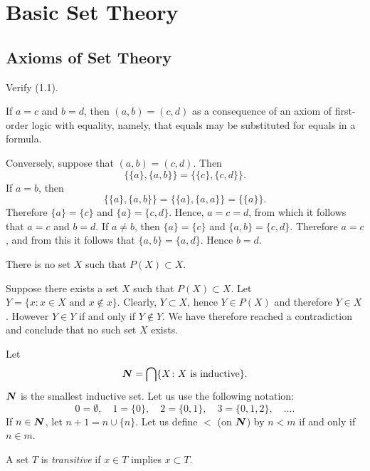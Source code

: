 \part{Basic Set Theory}

\chapter{Axioms of Set Theory}

 Verify (1.1).
\begin{solution}
  If $a = c$ and $b = d$, then $(a, b) = (c, d)$ as a consequence of an axiom of
  first-order logic with equality, namely, that equals may be substituted for
  equals in a formula.

  Conversely, suppose that $(a, b) = (c, d)$. Then
  \[
    \{ \{ a \}, \{ a, b \} \}  = \{ \{ c \}, \{ c, d \} \}.
  \]
  If $a = b$, then
  \[
    \{ \{ a \}, \{ a, b \} \} = \{ \{ a \}, \{ a, a \} \} = \{ \{ a \} \}.
  \]
  Therefore $\{ a \} = \{ c \}$ and  $\{ a \} = \{ c, d \}$. Hence, $a = c = d$,
  from which it follows that $a = c$ and $b = d$. If $a \neq b$, then
  $\{ a \} = \{ c \}$ and $\{ a, b \} = \{ c, d \}$. Therefore $a = c$, and from
  this it follows that $\{ a, b \} = \{ a, d \}$. Hence $b = d$.
\end{solution}

 There is no set $X$ such that $P(X) \subset X$.
\begin{solution}
  Suppose there exists a set $X$ such that $P(X) \subset X$. 
  Let $Y = \{ x : x \in X \text{ and } x \notin x \}$. Clearly, $Y \subset X$,
  hence $Y \in P(X)$ and therefore $Y \in X$. However $Y \in Y$ if and only if
  $Y \notin Y$. We have therefore reached a contradiction and conclude that no
  such set $X$ exists.
\end{solution}

Let
\[
  \boldsymbol{N} = \bigcap \{ X \colon X \text{ is inductive} \}.
\]
$\boldsymbol{N}$ is the smallest inductive set. Let us use the following notation:
\[
  0 = \emptyset, \quad
  1 = \{ 0 \}, \quad
  2 = \{ 0, 1 \}, \quad
  3 = \{ 0, 1, 2 \}, \quad
  \ldots.
\]
If $n \in \boldsymbol{N}$, let $ n + 1 = n \cup \{ n \}$. Let us define $<$ (on $\boldsymbol{N}$) by
$n < m$ if and only if $n \in m$.

A set $T$ is \emph{transitive} if $x \in T$ implies $x \subset T$.

